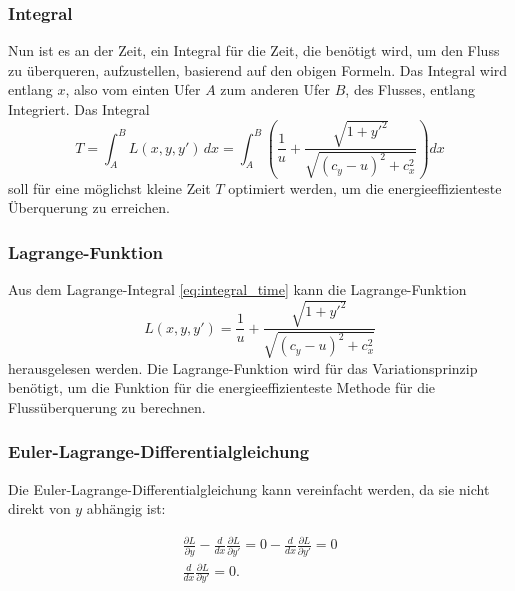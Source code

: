 \subsubsection{Integral} Nun ist es an der Zeit, ein Integral für die Zeit, die benötigt wird, um den Fluss zu überqueren, aufzustellen, basierend auf den obigen Formeln. Das Integral wird entlang \(x\), also vom einten Ufer \(A\) zum anderen Ufer \(B\), des Flusses, entlang Integriert. Das Integral
\begin{equation}\label{eq:integral_time}
    T = \int_A^B L(x, y, y') \, dx = \int_A^B \left( \frac{1}{u} + \frac{\sqrt{1 + y'^2}}{\sqrt{(c_y - u)^2 + c_x^2}} \right) dx
\end{equation}
soll für eine möglichst kleine Zeit \(T\) optimiert werden, um die energieeffizienteste Überquerung zu erreichen.

\subsubsection{Lagrange-Funktion} Aus dem Lagrange-Integral \ref{eq:integral_time} kann die Lagrange-Funktion
\begin{equation}\label{eq:lagrange_integral}
    L(x, y, y') = \frac{1}{u} + \frac{\sqrt{1 + y'^2}}{\sqrt{(c_y - u)^2 + c_x^2}}
\end{equation}
herausgelesen werden. Die Lagrange-Funktion wird für das Variationsprinzip benötigt, um die Funktion für die energieeffizienteste Methode für die Flussüberquerung zu berechnen.

\subsubsection{Euler-Lagrange-Differentialgleichung} Die Euler-Lagrange-Differentialgleichung kann vereinfacht werden, da sie nicht direkt von \(y\) abhängig ist:

\begin{gather}
    \frac{\partial L}{\partial y} - \frac{d}{dx}\frac{\partial L}{\partial y'} = 0 - \frac{d}{dx}\frac{\partial L}{\partial y'} = 0 \\
    \frac{d}{dx}\frac{\partial L}{\partial y'} = 0.
\end{gather}

